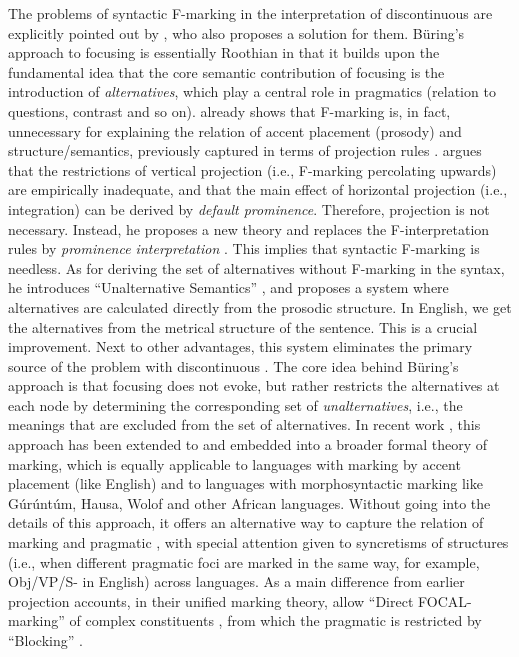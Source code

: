\documentclass[output=paper,colorlinks,citecolor=brown]{langscibook}
\begin{document}
The problems of syntactic F-marking in the interpretation of discontinuous  are explicitly pointed out by \citet{buring:16}, who also proposes a solution for them. B\"uring's approach to focusing is essentially Roothian in that it builds upon the fundamental idea that the core semantic contribution of focusing is the introduction of \textit{alternatives}, which play a central role in  pragmatics (relation to questions, contrast and so on). \citet{buring:06} already shows that F-marking is, in fact, unnecessary for explaining the relation of accent placement (prosody) and  structure/semantics, previously captured in terms of  projection rules \citep[][]{selkirk:95}. \citet{buring:06} argues that the restrictions of vertical projection (i.e., F-marking percolating upwards) are empirically inadequate, and that the main effect of horizontal projection (i.e., integration) can be derived by \textit{default prominence}. Therefore,  projection is not necessary. Instead, he proposes a new theory and replaces the F-interpretation rules by \textit{prominence interpretation} \citep[][343]{buring:06}. This implies that syntactic F-marking is needless. As for deriving the set of alternatives without F-marking in the syntax, he introduces ``Unalternative Semantics'' \citep[UAS;][]{buring:15,buring:16,buring:19}, and proposes a system where alternatives are calculated directly from the prosodic structure. In English, we get the alternatives from the metrical structure of the sentence. This is a crucial improvement. Next to other advantages, this system eliminates the primary source of the problem with discontinuous . The core idea behind B\"uring's approach is that focusing does not evoke, but rather restricts the alternatives at each node by determining the corresponding set of \textit{unalternatives}, i.e., the meanings that are excluded from the set of alternatives. In recent work \citep{assmann:etal:23}, this approach has been extended to and embedded into a broader formal theory of  marking, which is equally applicable to languages with  marking by accent placement (like English) and to languages with morphosyntactic  marking like G\'ur\'unt\'um, Hausa, Wolof and other African languages. Without going into the details of this approach, it offers an alternative way to capture the relation of  marking and pragmatic , with special attention given to syncretisms of  structures  (i.e., when different pragmatic foci are marked in the same way, for example, Obj/VP/S- in English) across languages. As a main difference from earlier  projection accounts, in their unified  marking theory, \citet{assmann:etal:23} allow ``Direct FOCAL-marking'' of complex constituents \citep[][1350]{assmann:etal:23}, from which the pragmatic  is restricted by ``Blocking'' \citep[][1379]{assmann:etal:23}. 
\end{document}
